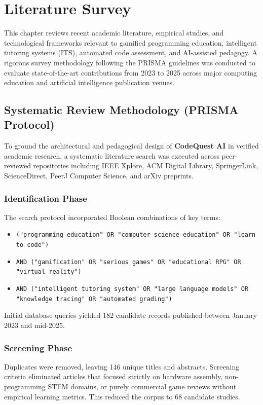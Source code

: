 \chapter{Literature Survey}
\label{ch:lit}

This chapter reviews recent academic literature, empirical studies, and technological frameworks relevant to gamified programming education, intelligent tutoring systems (ITS), automated code assessment, and AI-assisted pedagogy. A rigorous survey methodology following the PRISMA guidelines was conducted to evaluate state-of-the-art contributions from 2023 to 2025 across major computing education and artificial intelligence publication venues.

\section{Systematic Review Methodology (PRISMA Protocol)}
To ground the architectural and pedagogical design of \textbf{CodeQuest AI} in verified academic research, a systematic literature search was executed across peer-reviewed repositories including IEEE Xplore, ACM Digital Library, SpringerLink, ScienceDirect, PeerJ Computer Science, and arXiv preprints.

\subsection{Identification Phase}
The search protocol incorporated Boolean combinations of key terms:
\begin{itemize}
    \item \texttt{("programming education" OR "computer science education" OR "learn to code")}
    \item \texttt{AND ("gamification" OR "serious games" OR "educational RPG" OR "virtual reality")}
    \item \texttt{AND ("intelligent tutoring system" OR "large language models" OR "knowledge tracing" OR "automated grading")}
\end{itemize}
Initial database queries yielded 182 candidate records published between January 2023 and mid-2025.

\subsection{Screening Phase}
Duplicates were removed, leaving 146 unique titles and abstracts. Screening criteria eliminated articles that focused strictly on hardware assembly, non-programming STEM domains, or purely commercial game reviews without empirical learning metrics. This reduced the corpus to 68 candidate studies.

